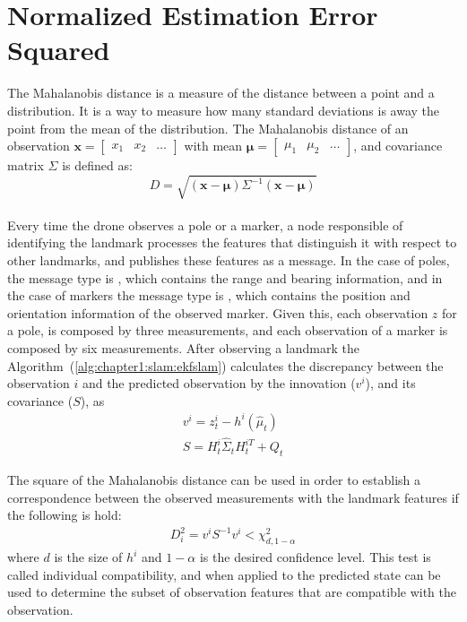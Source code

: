 \section{Normalized Estimation Error Squared}
\label{sec:chapter2:nees}
The Mahalanobis distance is a measure of the distance between a point and a distribution. It is a way to measure how many standard deviations is away the point from the mean of the distribution. The Mahalanobis distance of an observation $\bm{x} = \begin{bmatrix}x_1 & x_2 & \dots \end{bmatrix}$ with mean $\bm{\mu} = \begin{bmatrix}\mu_1 & \mu_2 & \dots \end{bmatrix}$, and covariance matrix $\Sigma$ is defined as:
\begin{equation}
    D = \sqrt{\left(\bm{x} - \bm{\mu}\right) \Sigma^{-1} \left(\bm{x} - \bm{\mu}\right)}
    \label{eq:chapter1:nees:mahalanobis}
\end{equation}\\
Every time the drone observes a pole or a marker, a node responsible of identifying the landmark processes the features that distinguish it with respect to other landmarks, and publishes these features as a message. In the case of poles, the message type is , which contains the range and bearing information, and in the case of markers the message type is , which contains the position and orientation information of the observed marker. Given this, each observation $z$ for a pole, is composed by three measurements, and each observation of a marker is composed by six measurements. After observing a landmark the Algorithm~(\ref{alg:chapter1:slam:ekfslam}) calculates the discrepancy between the observation $i$ and the predicted observation by the innovation ($v^i$), and its covariance ($S$), as
\begin{align*}
    v^i =  z_t^i - h^i \left( \hat\mu_t \right)\\
    S = H_t^i \hat\Sigma_t H_t^{iT} + Q_t
\end{align*}

The square of the Mahalanobis distance can be used in order to establish a correspondence between the observed measurements with the landmark features if the following is hold:
\begin{align}
    D_i^2 = v^i S^{-1} v^i < \chi_{d, 1-\alpha}^2
    \label{eq:chapter2:nees:innov_test}
\end{align}
where $d$ is the size of $h^i$ and $1-\alpha$ is the desired confidence level. This test is called individual compatibility, and when applied to the predicted state can be used to determine the subset of observation features that are compatible with the observation.\\

